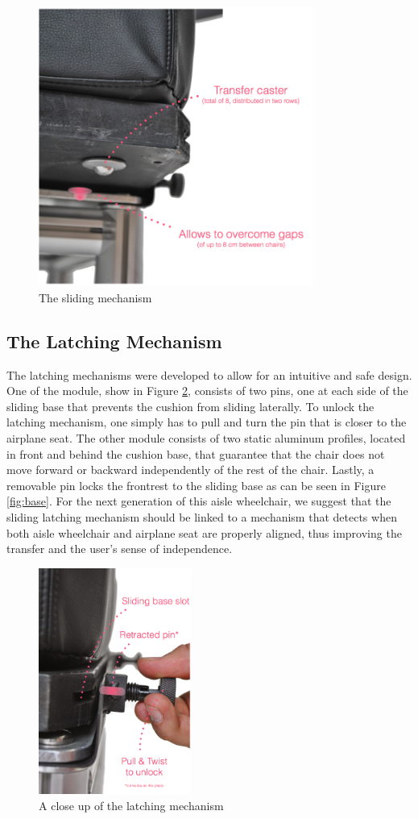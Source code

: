 \begin{figure}[h]
\centering
\includegraphics[width=9cm]{images/AisleWheelchair3.png}
\caption{The sliding mechanism}
\label{fig:sliding}
\end{figure}

\subsection{The Latching Mechanism}

The latching mechanisms were developed to allow for an intuitive and safe design. One of the module, show in Figure \ref{fig:latching},  consists of two pins, one at each side of the sliding base that prevents the cushion from sliding laterally. To unlock the latching mechanism, one simply has to pull and turn the pin that is closer to the airplane seat. The other module consists of two static aluminum profiles, located in front and behind the cushion base, that guarantee that the chair does not move forward or backward independently of the rest of the chair. Lastly, a removable pin locks the frontrest to the sliding base as can be seen in Figure \ref{fig:base}.
	For the next generation of this aisle wheelchair, we suggest that the sliding latching mechanism should be linked to a mechanism that detects when both aisle wheelchair and airplane seat are properly aligned, thus improving the transfer and the user's sense of independence.

\begin{figure}[h]
\centering
\includegraphics[width=5cm]{images/AisleWheelchair4.png}
\caption{A close up of the latching mechanism}
\label{fig:latching}
\end{figure}


